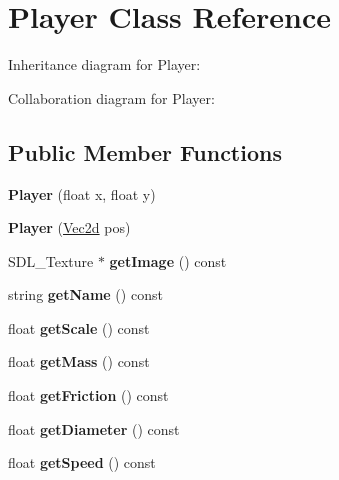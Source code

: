 \hypertarget{classPlayer}{}\section{Player Class Reference}
\label{classPlayer}


Inheritance diagram for Player\+:


Collaboration diagram for Player\+:
\subsection*{Public Member Functions}
\begin{DoxyCompactItemize}
\item 
\mbox{\label{classPlayer_a4c481b6493f9e0d550377c0d99763c82}} 
{\bfseries Player} (float x, float y)
\item 
\mbox{\label{classPlayer_ac515ecc67433555427f802c8bbb433e0}} 
{\bfseries Player} (\hyperlink{classVec2d}{Vec2d} pos)
\item 
\mbox{\label{classPlayer_af9d805bf8b2851bed2af621ebef9415c}} 
S\+D\+L\+\_\+\+Texture $\ast$ {\bfseries get\+Image} () const
\item 
\mbox{\label{classPlayer_a4939193fc637f75bf7a11118334dae7e}} 
string {\bfseries get\+Name} () const
\item 
\mbox{\label{classPlayer_ae5c80a58a6f44056fb3b6649b66a69c2}} 
float {\bfseries get\+Scale} () const
\item 
\mbox{\label{classPlayer_a75a140add786e9bc8dabe88c25ad9766}} 
float {\bfseries get\+Mass} () const
\item 
\mbox{\label{classPlayer_a6f2347a3c9d806c3432c6f901b789215}} 
float {\bfseries get\+Friction} () const
\item 
\mbox{\label{classPlayer_add79b8cbdf12cc512c7e8f49111f025e}} 
float {\bfseries get\+Diameter} () const
\item 
\mbox{\label{classPlayer_a515920b9f3992375f179ca17ee750dc1}} 
float {\bfseries get\+Speed} () const
\end{DoxyCompactItemize}
